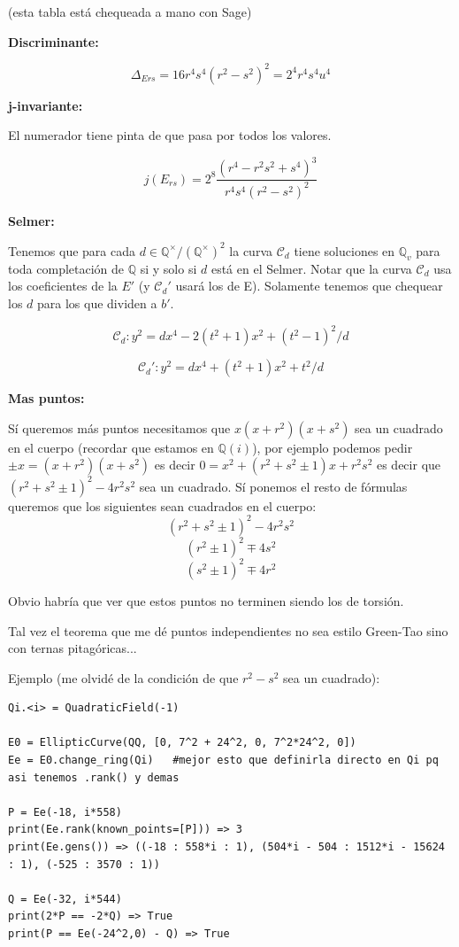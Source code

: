 \documentclass[12pt]{amsart}
\newcommand{\QQ}{\mathbb{Q}}
\newcommand{\cont}{\mathcal{C}}
\theoremstyle{plain}
\begin{document}
(esta tabla está chequeada a mano con Sage)

\textbf{Discriminante:}

\[
\Delta_{Ers} = 16 r^4 s^4 {(r^2-s^2)}^2 = 2^4 r^4 s^4 u^4
\]


\textbf{j-invariante:}

El numerador tiene pinta de que pasa por todos los valores.

\[
j(E_{rs}) = 2^8 \frac{{(r^4 - r^2s^2 + s^4)}^3}{r^4s^4{(r^2-s^2)}^2}
\]


\textbf{Selmer:}

Tenemos que para cada $d \in \QQ^\times / {(\QQ^\times)}^2$ la curva $\cont_d$ tiene soluciones en $\QQ_v$ para toda completación de $\QQ$ si y solo si $d$ está en el Selmer. Notar que la curva $\cont_d$ usa los coeficientes de la $E'$ (y $\cont_d'$ usará los de E). Solamente tenemos que chequear los $d$ para los que dividen a $b'$.

\[
\cont_d : y^2 = dx^4 -2(t^2+1) x^2+ {(t^2-1)}^2/d
\]

\[
\cont_d' : y^2 = dx^4 +(t^2+1) x^2+ t^2/d
\]

\textbf{Mas puntos:}

Sí queremos más puntos necesitamos que $x(x+r^2)(x+s^2)$ sea un cuadrado en el cuerpo (recordar que estamos en $\QQ(i)$), por ejemplo podemos pedir $\pm x = (x+r^2)(x+s^2)$ es decir $0 = x^2+(r^2+s^2\pm 1)x +r^2s^2$ es decir que ${(r^2+s^2\pm 1)}^2-4r^2s^2$ sea un cuadrado. Sí ponemos el resto de fórmulas queremos que los siguientes sean cuadrados en el cuerpo:
\[
{(r^2+s^2\pm 1)}^2-4r^2s^2 
\]
\[
{(r^2\pm 1)}^2\mp 4s^2
\]
\[
{(s^2\pm 1)}^2\mp 4r^2
\]

Obvio habría que ver que estos puntos no terminen siendo los de torsión. 

Tal vez el teorema que me dé puntos independientes no sea estilo Green-Tao sino con ternas pitagóricas...

Ejemplo (me olvidé de la condición de que $r^2-s^2$ sea un cuadrado):

\begin{lstlisting}[style=micode]
Qi.<i> = QuadraticField(-1)

E0 = EllipticCurve(QQ, [0, 7^2 + 24^2, 0, 7^2*24^2, 0])
Ee = E0.change_ring(Qi)   #mejor esto que definirla directo en Qi pq asi tenemos .rank() y demas

P = Ee(-18, i*558)
print(Ee.rank(known_points=[P])) => 3
print(Ee.gens()) => ((-18 : 558*i : 1), (504*i - 504 : 1512*i - 15624 : 1), (-525 : 3570 : 1))

Q = Ee(-32, i*544) 
print(2*P == -2*Q) => True
print(P == Ee(-24^2,0) - Q) => True
\end{lstlisting}
\end{document}

